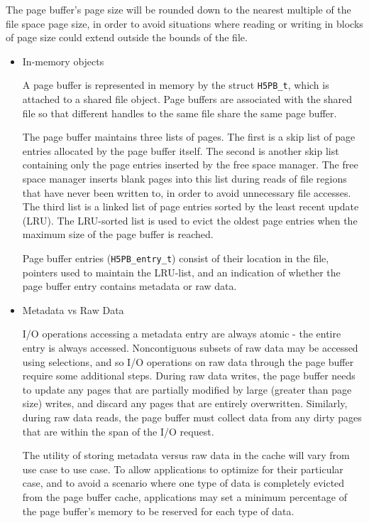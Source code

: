 The page buffer's page size will be rounded down to the nearest multiple of the file space page size, in order to avoid situations where reading or writing in blocks of page size could extend outside the bounds of the file.

\begin{itemize}

    \item In-memory objects

A page buffer is represented in memory by the struct \texttt{H5PB\_t}, which is attached to a shared file object. Page buffers are associated with the shared file so that different handles to the same file share the same page buffer.

The page buffer maintains three lists of pages. The first is a skip list of page entries allocated by the page buffer itself. The second is another skip list containing only the page entries inserted by the free space manager. The free space manager inserts blank pages into this list during reads of file regions that have never been written to, in order to avoid unnecessary file accesses. The third list is a linked list of page entries sorted by the least recent update (LRU). The LRU-sorted list is used to evict the oldest page entries when the maximum size of the page buffer is reached. 

Page buffer entries (\texttt{H5PB\_entry\_t}) consist of their location in the file, pointers used to maintain the LRU-list, and an indication of whether the page buffer entry contains metadata or raw data. 

    \item Metadata vs Raw Data

I/O operations accessing a metadata entry are always atomic - the entire entry is always accessed. Noncontiguous subsets of raw data may be accessed using selections, and so I/O operations on raw data through the page buffer require some additional steps. During raw data writes, the page buffer needs to update any pages that are partially modified by large (greater than page size) writes, and discard any pages that are entirely overwritten. Similarly, during raw data reads, the page buffer must collect data from any dirty pages that are within the span of the I/O request. 

The utility of storing metadata versus raw data in the cache will vary from use case to use case. To allow applications to optimize for their particular case, and to avoid a scenario where one type of data is completely evicted from the page buffer cache, applications may set a minimum percentage of the page buffer's memory to be reserved for each type of data.


\end{itemize}
